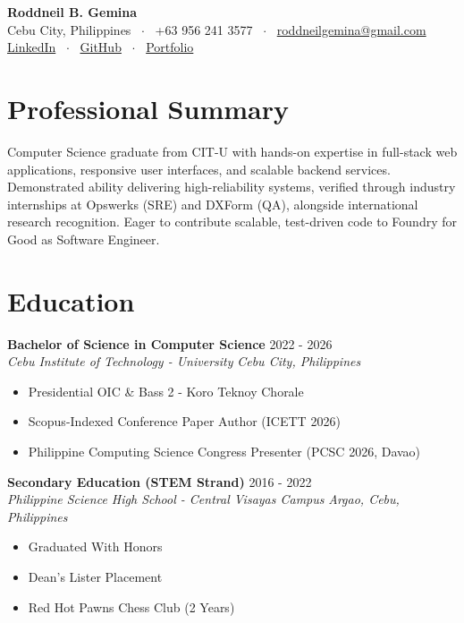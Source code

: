 \documentclass[letterpaper,10pt]{article}
\begin{document}
\begin{center}
    {\LARGE \textbf{Roddneil B. Gemina}} \\ \vspace{2pt}
    \small Cebu City, Philippines \ $\cdot$ \ +63 956 241 3577 \ $\cdot$ \ \href{mailto:roddneilgemina@gmail.com}{roddneilgemina@gmail.com} \\ \vspace{2pt}
    \href{https://www.linkedin.com/in/roddneil-gemina-20b423409}{LinkedIn} \ $\cdot$ \ \href{https://github.com/RoddneilGemina}{GitHub} \ $\cdot$ \ \href{https://roddneilgemina.github.io}{Portfolio}
\end{center}

\vspace{-4pt}
\section{Professional Summary}
Computer Science graduate from CIT-U with hands-on expertise in full-stack web applications, responsive user interfaces, and scalable backend services. Demonstrated ability delivering high-reliability systems, verified through industry internships at Opswerks (SRE) and DXForm (QA), alongside international research recognition. Eager to contribute scalable, test-driven code to Foundry for Good as Software Engineer.

\section{Education}
\textbf{Bachelor of Science in Computer Science} \hfill 2022 - 2026
\\ \textit{Cebu Institute of Technology - University} \hfill \textit{Cebu City, Philippines}
\begin{itemize}
  \item Presidential OIC \& Bass 2 - Koro Teknoy Chorale
  \item Scopus-Indexed Conference Paper Author (ICETT 2026)
  \item Philippine Computing Science Congress Presenter (PCSC 2026, Davao)
\end{itemize}
\vspace{4pt}
\textbf{Secondary Education (STEM Strand)} \hfill 2016 - 2022
\\ \textit{Philippine Science High School - Central Visayas Campus} \hfill \textit{Argao, Cebu, Philippines}
\begin{itemize}
  \item Graduated With Honors
  \item Dean's Lister Placement
  \item Red Hot Pawns Chess Club (2 Years)
\end{itemize}
\vspace{4pt}
\end{document}
